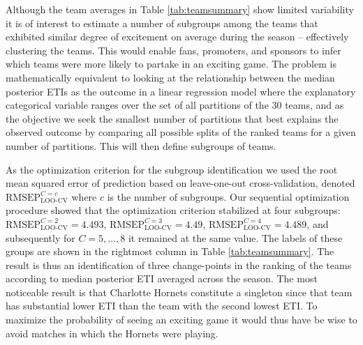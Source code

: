 \documentclass[
  11pt,
]{svjour3}
\theoremstyle{nonumberplain}
\begin{document}
Although the team averages in Table \ref{tab:teamsummary} show limited
variability it is of interest to estimate a number of subgroups among
the teams that exhibited similar degree of excitement on average during
the season -- effectively clustering the teams. This would enable fans,
promoters, and sponsors to infer which teams were more likely to partake
in an exciting game. The problem is mathematically equivalent to looking
at the relationship between the median posterior ETIs as the outcome in
a linear regression model where the explanatory categorical variable
ranges over the set of all partitions of the 30 teams, and as the
objective we seek the smallest number of partitions that best explains
the observed outcome by comparing all possible splits of the ranked
teams for a given number of partitions. This will then define subgroups
of teams.

As the optimization criterion for the subgroup identification we used
the root mean squared error of prediction based on leave-one-out
cross-validation, denoted \(\textrm{RMSEP}_\text{LOO-CV}^{C = c}\) where
\(c\) is the number of subgroups. Our sequential optimization procedure
showed that the optimization criterion stabilized at four subgroups:
\(\textrm{RMSEP}_\text{LOO-CV}^{C=2} = 4.493\),
\(\textrm{RMSEP}_\text{LOO-CV}^{C=3} = 4.49\),
\(\textrm{RMSEP}_\text{LOO-CV}^{C=4} = 4.489\), and subsequently for
\(C = 5,\ldots,8\) it remained at the same value. The labels of these
groups are shown in the rightmost column in Table \ref{tab:teamsummary}.
The result is thus an identification of three change-points in the
ranking of the teams according to median posterior ETI averaged across
the season. The most noticeable result is that Charlotte Hornets
constitute a singleton since that team has substantial lower ETI than
the team with the second lowest ETI. To maximize the probability of
seeing an exciting game it would thus have be wise to avoid matches in
which the Hornets were playing.
\end{document}
